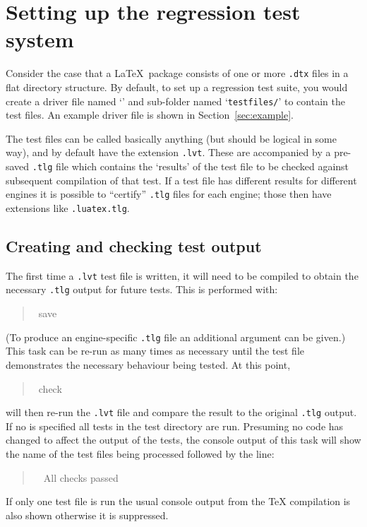 \documentclass[final]{ltugboat}
\begin{document}
\section{Setting up the regression test system}

Consider the case that a \LaTeX\ package consists of one or more
\texttt{.dtx} files in a flat directory structure.  By default,
to set up a regression test suite, you would create a driver file
named `\texttt{\drivername}' and sub-folder named
`\texttt{testfiles/}' to contain the test files.  An example driver
file is shown in Section~\ref{sec:example}.

The test files can be called basically anything (but should be logical
in some way), and by default have the extension \texttt{.lvt}.  These are
accompanied by a pre-saved \texttt{.tlg} file which contains the
`results' of the test file to be checked against subsequent
compilation of that test. If a test file has different results for
different engines it is possible to ``certify'' \texttt{.tlg} files for
each engine; those then have extensions like \texttt{.luatex.tlg}.


\subsection{Creating and checking test output}

The first time a \texttt{.lvt} test file is written, it will need to
be compiled to obtain the necessary \texttt{.tlg} output for future
tests.  This is performed with:
\begin{quote}\ttfamily
\execname~save~
\end{quote}
(To produce an engine-specific \texttt{.tlg} file an additional
 argument can be given.)  This task can be re-run as
many times as necessary until the test file demonstrates the necessary
behaviour being tested.
%
At this point, 
\begin{quote}\ttfamily
\execname~check~
\end{quote}
will then re-run the \texttt{.lvt} file and compare the result to the
original \texttt{.tlg} output.  
If no  is specified all tests in the test directory are run. Presuming no code has changed to
affect the output of the tests, the console output of this task will show the name of the test files being processed followed by the line:
\begin{quote}\ttfamily
~~All checks passed
\end{quote}
If only one test file is run the usual console output from the \TeX{} compilation is also shown otherwise it is suppressed.
\end{document}
